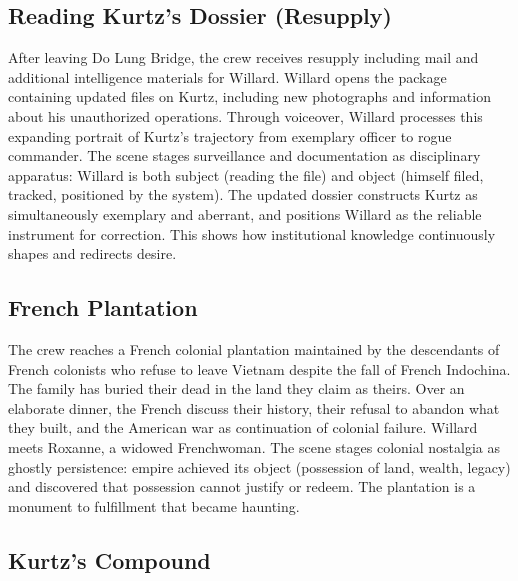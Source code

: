 \pagebreak[0]
\subsection*{Reading Kurtz's Dossier (Resupply)}
\label{scene:dossier-reading}

After leaving Do Lung Bridge, the crew receives resupply including mail and additional
intelligence materials for Willard. Willard opens the package containing updated files on Kurtz,
including new photographs and information about his unauthorized operations. Through voiceover,
Willard processes this expanding portrait of Kurtz's trajectory from exemplary officer to rogue
commander. The scene stages surveillance and documentation as disciplinary apparatus: Willard is
both subject (reading the file) and object (himself filed, tracked, positioned by the system).
The updated dossier constructs Kurtz as simultaneously exemplary and aberrant, and positions
Willard as the reliable instrument for correction. This shows how institutional knowledge
continuously shapes and redirects desire.

\pagebreak[0]
\subsection*{French Plantation}
\label{scene:french-plantation}

The crew reaches a French colonial plantation maintained by the descendants of French colonists
who refuse to leave Vietnam despite the fall of French Indochina. The family has buried their
dead in the land they claim as theirs. Over an elaborate dinner, the French discuss their
history, their refusal to abandon what they built, and the American war as continuation of
colonial failure. Willard meets Roxanne, a widowed Frenchwoman. The scene stages colonial
nostalgia as ghostly persistence: empire achieved its object (possession of land, wealth,
legacy) and discovered that possession cannot justify or redeem. The plantation is a monument
to fulfillment that became haunting.

\pagebreak[0]
\subsection*{Kurtz's Compound}
\label{scene:kurtz-compound}


